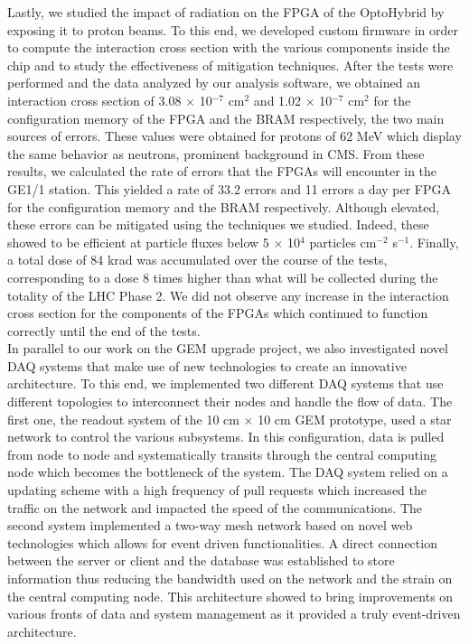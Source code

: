   Lastly, we studied the impact of radiation on the FPGA of the OptoHybrid by exposing it to proton beams. To this end, we developed custom firmware in order to compute the interaction cross section with the various components inside the chip and to study the effectiveness of mitigation techniques. After the tests were performed and the data analyzed by our analysis software, we obtained an interaction cross section of 3.08 $ \times $ 10$^{-7}$ cm$^{2}$ and 1.02 $ \times $ 10$^{-7}$ cm$^{2}$ for the configuration memory of the FPGA and the BRAM respectively, the two main sources of errors. These values were obtained for protons of 62 MeV which display the same behavior as neutrons, prominent background in CMS. From these results, we calculated the rate of errors that the FPGAs will encounter in the GE1/1 station. This yielded a rate of 33.2 errors and 11 errors a day per FPGA for the configuration memory and the BRAM respectively. Although elevated, these errors can be mitigated using the techniques we studied. Indeed, these showed to be efficient at particle fluxes below 5 $ \times $ 10$^4$ particles cm$^{-2}$ s$^{-1}$. Finally, a total dose of 84 krad was accumulated over the course of the tests, corresponding to a dose 8 times higher than what will be collected during the totality of the LHC Phase 2. We did not observe any increase in the interaction cross section for the components of the FPGAs which continued to function correctly until the end of the tests. \\

  In parallel to our work on the GEM upgrade project, we also investigated novel DAQ systems that make use of new technologies to create an innovative architecture. To this end, we implemented two different DAQ systems that use different topologies to interconnect their nodes and handle the flow of data. The first one, the readout system of the 10 cm $ \times $ 10 cm GEM prototype, used a star network to control the various subsystems. In this configuration, data is pulled from node to node and systematically transits through the central computing node which becomes the bottleneck of the system. The DAQ system relied on a updating scheme with a high frequency of pull requests which increased the traffic on the network and impacted the speed of the communications. The second system implemented a two-way mesh network based on novel web technologies which allows for event driven functionalities. A direct connection between the server or client and the database was established to store information thus reducing the bandwidth used on the network and the strain on the central computing node. This architecture showed to bring improvements on various fronts of data and system management as it provided a truly event-driven architecture.
